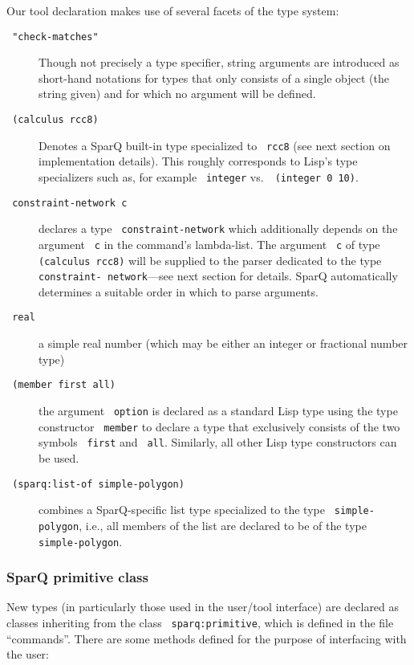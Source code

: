 \documentclass[headsepline]{scrreprt}
\theoremstyle{definition}
\newcommand{\engine}{SparQ}
\begin{document}
Our tool declaration makes use of several facets of the type system:
\begin{description}
	\item[\texttt{ "check-matches"}] Though not precisely a type specifier, string arguments are introduced as short-hand notations for types that only consists of a single object (the string given) and for which no argument will be defined.
	
	\item[\texttt{ (calculus rcc8)}] Denotes a \engine{} built-in type specialized to \texttt{ rcc8} (see next section on implementation details). This roughly corresponds to Lisp's type specializers such as, for example \texttt{ integer} vs.~\texttt{ (integer 0 10)}.
	
	\item[\texttt{ constraint-network c}] declares a type \texttt{ constraint-network} which additionally depends on the argument \texttt{ c} in the command's lambda-list. The argument \texttt{ c} of type \texttt{ (calculus rcc8)} will be supplied to the parser dedicated to the type \texttt{ constraint- network}---see next section for details. \engine{} automatically determines a suitable order in which to parse arguments.
	
	\item[\texttt{ real}] a simple real number (which may be either an integer or fractional number type)

	\item[\texttt{ (member first all)}] the argument \texttt{ option} is declared as a standard Lisp type using the type constructor \texttt{ member} to declare a type that exclusively consists of the two symbols \texttt{ first} and \texttt{ all}. Similarly, all other Lisp type constructors can be used.
		
	\item[\texttt{ (sparq:list-of simple-polygon)}] combines a \engine{}-specific list type specialized to the type \texttt{ simple-polygon}, i.e., all members of the list are declared to be of the type \texttt{ simple-polygon}.
	
\end{description}

\subsubsection{\engine{} primitive class}
New types (in particularly those used in the user/tool interface) are declared as classes inheriting from the class \texttt{ sparq:primitive}, which is defined in the file ``commands''. There are some methods defined for the purpose of interfacing with the user:
\end{document}
